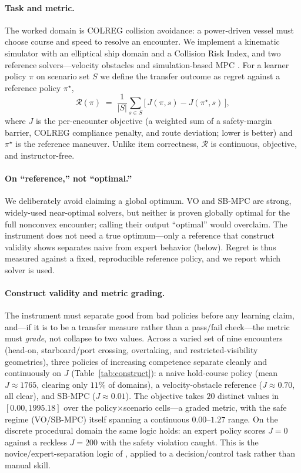 \documentclass{article}
\newcommand{\regret}{\mathcal{R}}
\begin{document}
\paragraph{Task and metric.} The worked domain is COLREG collision avoidance: a
power-driven vessel must choose course and speed to resolve an encounter. We implement a
kinematic simulator with an elliptical ship domain and a Collision Risk Index, and two
reference solvers---velocity obstacles \citep{fiorini1998vo} and simulation-based
MPC \citep{johansen2016sbmpc}. For a learner policy $\pi$ on scenario set $S$ we define the
transfer outcome as regret against a reference policy $\pi^\star$,
\begin{equation}
  \regret(\pi) \;=\; \frac{1}{|S|}\sum_{s \in S}\big[\, J(\pi, s) - J(\pi^\star, s)\,\big],
\end{equation}
where $J$ is the per-encounter objective (a weighted sum of a safety-margin barrier, COLREG
compliance penalty, and route deviation; lower is better) and $\pi^\star$ is the reference
maneuver. Unlike item correctness, $\regret$ is continuous, objective, and instructor-free.

\paragraph{On ``reference,'' not ``optimal.''} We deliberately avoid claiming a global
optimum. VO and SB-MPC are strong, widely-used near-optimal solvers, but neither is proven
globally optimal for the full nonconvex encounter; calling their output ``optimal'' would
overclaim. The instrument does not need a true optimum---only a reference that construct
validity shows separates naive from expert behavior (below). Regret is thus measured
against a fixed, reproducible reference policy, and we report which solver is used.

\paragraph{Construct validity and metric grading.} The instrument must separate good from
bad policies before any learning claim, and---if it is to be a transfer measure rather than
a pass/fail check---the metric must \emph{grade}, not collapse to two values. Across a
varied set of nine encounters (head-on, starboard/port crossing, overtaking, and
restricted-visibility geometries), three policies of increasing competence separate cleanly
and continuously on $J$ (Table~\ref{tab:construct}): a naive hold-course policy
(mean $J\approx1765$, clearing only $11\%$ of domains), a velocity-obstacle reference
($J\approx0.70$, all clear), and SB-MPC ($J\approx0.01$). The objective takes $20$ distinct
values in $[0.00, 1995.18]$ over the policy$\times$scenario cells---a graded metric, with
the safe regime (VO/SB-MPC) itself spanning a continuous $0.00$--$1.27$ range. On the
discrete procedural domain the same logic holds: an expert policy scores $J=0$ against a
reckless $J=200$ with the safety violation caught. This is the novice/expert-separation
logic of \citet{vandongen2007lapsim}, applied to a decision/control task rather than manual
skill.
\end{document}
